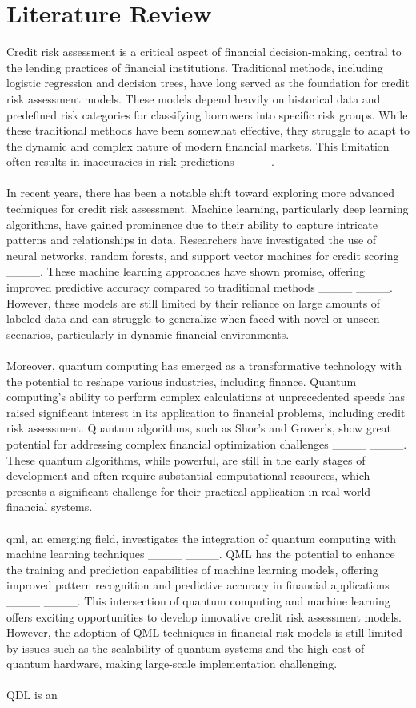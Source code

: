 \section{Literature Review}
Credit risk assessment is a critical aspect of financial decision-making, central to the lending practices of financial institutions. Traditional methods, including logistic regression and decision trees, have long served as the foundation for credit risk assessment models. These models depend heavily on historical data and predefined risk categories for classifying borrowers into specific risk groups. While these traditional methods have been somewhat effective, they struggle to adapt to the dynamic and complex nature of modern financial markets. This limitation often results in inaccuracies in risk predictions ____.\\\\In recent years, there has been a notable shift toward exploring more advanced techniques for credit risk assessment. Machine learning, particularly deep learning algorithms, have gained prominence due to their ability to capture intricate patterns and relationships in data. Researchers have investigated the use of neural networks, random forests, and support vector machines for credit scoring ____. These machine learning approaches have shown promise, offering improved predictive accuracy compared to traditional methods ____ ____. However, these models are still limited by their reliance on large amounts of labeled data and can struggle to generalize when faced with novel or unseen scenarios, particularly in dynamic financial environments.\\\\Moreover, quantum computing has emerged as a transformative technology with the potential to reshape various industries, including finance. Quantum computing's ability to perform complex calculations at unprecedented speeds has raised significant interest in its application to financial problems, including credit risk assessment. Quantum algorithms, such as Shor's and Grover's, show great potential for addressing complex financial optimization challenges ____ ____. These quantum algorithms, while powerful, are still in the early stages of development and often require substantial computational resources, which presents a significant challenge for their practical application in real-world financial systems.\\\\ \gls{qml}, an emerging field, investigates the integration of quantum computing with machine learning techniques ____ ____. QML has the potential to enhance the training and prediction capabilities of machine learning models, offering improved pattern recognition and predictive accuracy in financial applications ____ ____. This intersection of quantum computing and machine learning offers exciting opportunities to develop innovative credit risk assessment models. However, the adoption of QML techniques in financial risk models is still limited by issues such as the scalability of quantum systems and the high cost of quantum hardware, making large-scale implementation challenging.\\\\ QDL is an 